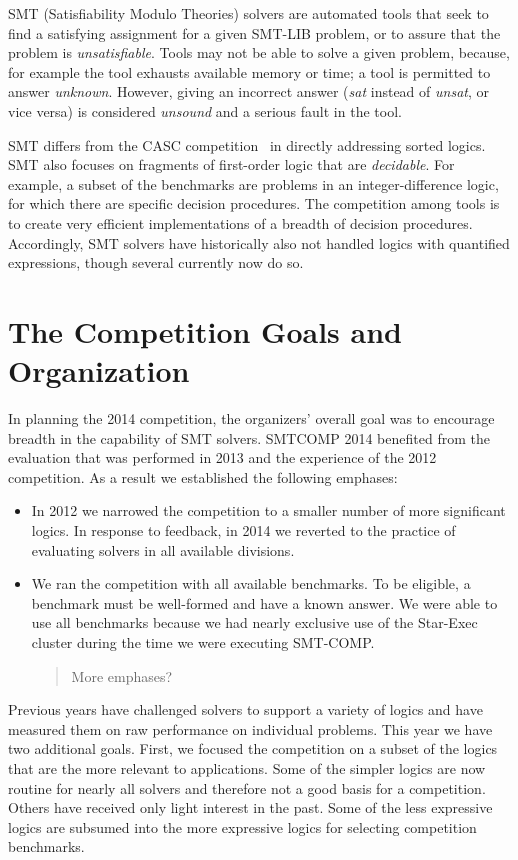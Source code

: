 \documentclass[twosize,11pt]{article}
\newcommand{\comment}[2]{\begin{quote}\sc #1\marginpar{\textcolor{red}{$\ast^{\mbox{#2}}$}}\end{quote}}
\newcommand{\tjark}[1]{\comment{#1}{TW}}
\newcommand{\tjarkx}[1]{\tjark{#1}}
\begin{document}
SMT (Satisfiability Modulo Theories) solvers are automated tools that seek to find a satisfying assignment for a given SMT-LIB problem, or to assure that the problem is \textit{unsatisfiable}.
Tools may not be able to solve a given problem, because, for example the tool exhausts available memory or time; a tool is permitted to answer \textit{unknown}. However, giving an incorrect answer (\textit{sat} instead of \textit{unsat}, or vice versa) is considered \textit{unsound} and a serious fault in the tool.

SMT differs from the CASC competition~\cite{PSS02} in directly addressing sorted logics. SMT also focuses on fragments of first-order logic that are \textit{decidable}. For example, a subset of the benchmarks are problems in an integer-difference logic, for which there are specific decision procedures. The competition among tools is to create very efficient implementations of a breadth of decision procedures. Accordingly, SMT solvers have historically also not handled logics with quantified expressions, though several currently now do so.

\section{The Competition Goals and Organization}
\label{sec:goals}

In planning the 2014 competition, the organizers' overall goal was to encourage breadth
in the capability of SMT solvers. SMTCOMP 2014 benefited from the evaluation that was performed in 2013 and the experience of the 2012 competition. As a result we established the following emphases:
\begin{itemize}
\item In 2012 we narrowed the competition to a smaller number of more significant logics. In response to feedback, in 2014 we reverted to the practice of evaluating solvers in all available divisions.
\item We ran the competition with all available benchmarks. To be eligible, a benchmark must be well-formed and have a known answer. We were able to use all benchmarks because we had nearly exclusive use of the Star-Exec cluster during the time we were executing SMT-COMP.
\tjarkx{More emphases?}

\end{itemize}

Previous years have challenged solvers to support a variety of logics and
have measured them on raw performance on individual problems. This year we have two additional goals. First, we
focused the competition on a subset of the logics that are the more relevant to applications. Some of the 
simpler logics are now routine for nearly all solvers and therefore not a good basis for a competition. Others have 
received only light interest in the past. Some of the less expressive logics are subsumed into the more expressive logics
for selecting competition benchmarks.
\end{document}
